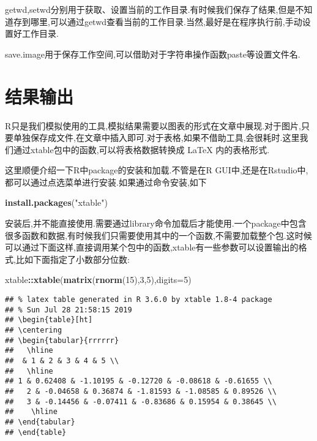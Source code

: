\documentclass[]{ctexbook}
\newenvironment{Shaded}{\begin{snugshade}}{\end{snugshade}}
\newcommand{\DataTypeTok}[1]{\textcolor[rgb]{0.13,0.29,0.53}{#1}}
\newcommand{\DecValTok}[1]{\textcolor[rgb]{0.00,0.00,0.81}{#1}}
\newcommand{\KeywordTok}[1]{\textcolor[rgb]{0.13,0.29,0.53}{\textbf{#1}}}
\newcommand{\NormalTok}[1]{#1}
\newcommand{\OperatorTok}[1]{\textcolor[rgb]{0.81,0.36,0.00}{\textbf{#1}}}
\newcommand{\StringTok}[1]{\textcolor[rgb]{0.31,0.60,0.02}{#1}}
\begin{document}
getwd,setwd分别用于获取、设置当前的工作目录.有时候我们保存了结果,但是不知道存到哪里,可以通过getwd查看当前的工作目录.当然,最好是在程序执行前,手动设置好工作目录.

save.image用于保存工作空间,可以借助对于字符串操作函数paste等设置文件名.

\hypertarget{section-7}{%
\section{结果输出}\label{section-7}}

R只是我们模拟使用的工具,模拟结果需要以图表的形式在文章中展现.对于图片,只要单独保存成文件,在文章中插入即可.对于表格,如果不借助工具,会很耗时.这里我们通过xtable包中的函数,可以将表格数据转换成 LaTeX 内的表格形式.

这里顺便介绍一下R中package的安装和加载.不管是在R GUI中,还是在Rstudio中,都可以通过点选菜单进行安装.如果通过命令安装,如下

\begin{Shaded}
\begin{Highlighting}[]
\KeywordTok{install.packages}\NormalTok{(}\StringTok{"xtable"}\NormalTok{)}
\end{Highlighting}
\end{Shaded}

安装后,并不能直接使用.需要通过library命令加载后才能使用.一个package中包含很多函数和数据,有时候我们只需要使用其中的一个函数,不需要加载整个包.这时候可以通过下面这样,直接调用某个包中的函数,xtable有一些参数可以设置输出的格式,比如下面指定了小数部分位数:

\begin{Shaded}
\begin{Highlighting}[]
\NormalTok{xtable}\OperatorTok{::}\KeywordTok{xtable}\NormalTok{(}\KeywordTok{matrix}\NormalTok{(}\KeywordTok{rnorm}\NormalTok{(}\DecValTok{15}\NormalTok{),}\DecValTok{3}\NormalTok{,}\DecValTok{5}\NormalTok{),}\DataTypeTok{digits=}\DecValTok{5}\NormalTok{)}
\end{Highlighting}
\end{Shaded}

\begin{verbatim}
## % latex table generated in R 3.6.0 by xtable 1.8-4 package
## % Sun Jul 28 21:58:15 2019
## \begin{table}[ht]
## \centering
## \begin{tabular}{rrrrrr}
##   \hline
##  & 1 & 2 & 3 & 4 & 5 \\ 
##   \hline
## 1 & 0.62408 & -1.10195 & -0.12720 & -0.08618 & -0.61655 \\ 
##   2 & -0.04658 & 0.36874 & -1.81593 & -1.08585 & 0.89526 \\ 
##   3 & -0.14456 & -0.07411 & -0.83686 & 0.15954 & 0.38645 \\ 
##    \hline
## \end{tabular}
## \end{table}
\end{verbatim}
\end{document}
